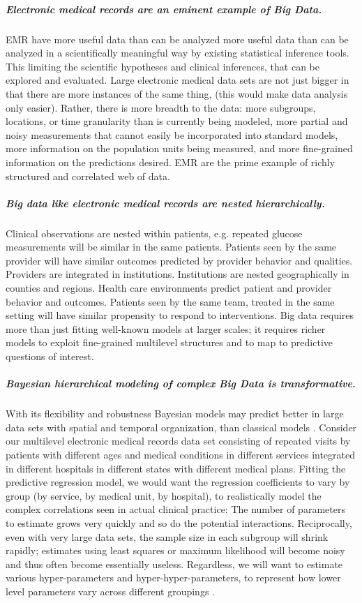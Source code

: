 \documentclass[11pt,notitlepage]{article}
\begin{document}
\subparagraph{Electronic medical records are an eminent example of Big Data. }
EMR have more useful data than can be analyzed more useful data than can be analyzed in a scientifically meaningful way by existing statistical inference tools. This limiting the scientific hypotheses and clinical inferences, that can be explored and evaluated. Large electronic medical data sets are not just bigger in that there are more instances of the same thing, (this would make data analysis only easier). Rather, there is more breadth to the data: more subgroups, locations, or time granularity than is currently being modeled, more partial and noisy measurements that cannot easily be incorporated into standard models, more information on the population units being measured, and more fine-grained information on the predictions desired. EMR are the prime example of richly structured and correlated web of data.

\subparagraph{Big data like electronic medical records are nested hierarchically.}
Clinical observations are nested within patients, e.g. repeated glucose measurements will be similar in the same patients. Patients seen by the same provider will have similar outcomes predicted by provider behavior and qualities. Providers are integrated in institutions. Institutions are nested geographically in counties and regions. Health care environments predict patient and provider behavior and outcomes. Patients seen by the same team, treated in the same setting will have similar propensity to respond to interventions. Big data requires more than just fitting well-known models at larger scales; it requires richer models to exploit fine-grained multilevel structures and to map to predictive questions of interest.

\subparagraph*{Bayesian hierarchical modeling of complex Big Data is transformative.}
With its flexibility and robustness Bayesian models may predict better in large data sets with spatial and temporal organization, than classical models \cite{Gelman_red_2009}.  Consider our multilevel electronic medical records data set consisting of repeated visits by patients with different ages and medical conditions in different services integrated in different hospitals in different states with different medical plans. Fitting the predictive regression model, we would want the regression coefficients to vary by group (by service, by medical unit, by hospital), to realistically model the complex correlations seen in actual clinical practice: The number of parameters to estimate grows very quickly and so do the potential interactions. Reciprocally, even with very large data sets, the sample size in each subgroup will shrink rapidly; estimates using least squares or maximum likelihood will become noisy and thus often become essentially useless. Regardless, we  will want to estimate various hyper-parameters and hyper-hyper-parameters, to represent how lower level parameters vary across different groupings \cite{Bafumi_Gelman_2007}.
\end{document}
